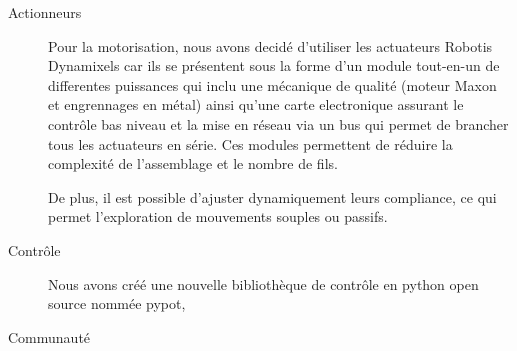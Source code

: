 \begin{description}
  \item[Actionneurs] Pour la motorisation, nous avons decidé d'utiliser les actuateurs Robotis Dynamixels car ils se présentent sous la forme d'un module tout-en-un de differentes puissances qui inclu une mécanique de qualité (moteur Maxon et engrennages en métal) ainsi qu'une carte electronique assurant le contrôle bas niveau et la mise en réseau via un bus qui permet de brancher tous les actuateurs en série. Ces modules permettent de réduire la complexité de l'assemblage et le nombre de fils.

  De plus, il est possible d'ajuster dynamiquement leurs compliance, ce qui permet l'exploration de mouvements souples ou passifs.

  \item[Contrôle] Nous avons créé une nouvelle bibliothèque de contrôle en python open source nommée pypot, 
  \item[Communauté]
\end{description}
